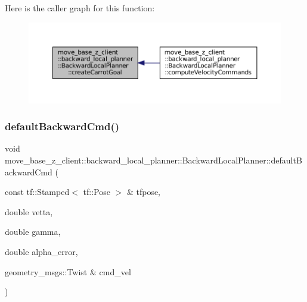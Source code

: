 Here is the caller graph for this function\+:
\nopagebreak
\begin{figure}[H]
\begin{center}
\leavevmode
\includegraphics[width=350pt]{classmove__base__z__client_1_1backward__local__planner_1_1BackwardLocalPlanner_a0a48c91cb8043aa15d01eec4931e8552_icgraph}
\end{center}
\end{figure}
\mbox{\label{classmove__base__z__client_1_1backward__local__planner_1_1BackwardLocalPlanner_a9f3977494d5f80884eb1a1d09b5b4673}} 
\subsubsection{\texorpdfstring{default\+Backward\+Cmd()}{defaultBackwardCmd()}}
{\footnotesize\ttfamily void move\+\_\+base\+\_\+z\+\_\+client\+::backward\+\_\+local\+\_\+planner\+::\+Backward\+Local\+Planner\+::default\+Backward\+Cmd (\begin{DoxyParamCaption}\item[{const tf\+::\+Stamped$<$ tf\+::\+Pose $>$ \&}]{tfpose,  }\item[{double}]{vetta,  }\item[{double}]{gamma,  }\item[{double}]{alpha\+\_\+error,  }\item[{geometry\+\_\+msgs\+::\+Twist \&}]{cmd\+\_\+vel }\end{DoxyParamCaption})\hspace{0.3cm}{\ttfamily [private]}}

